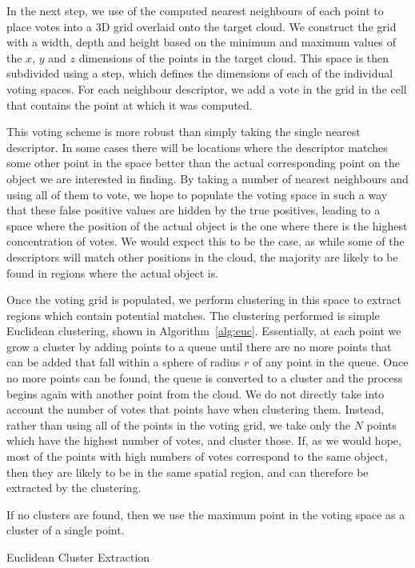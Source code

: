 \documentclass[11pt,a4paper]{kth-mag}
\begin{document}
In the next step, we use of the computed nearest neighbours of each point to
place votes into a 3D grid overlaid onto the target cloud. We construct the grid
with a width, depth and height based on the minimum and maximum values of the
$x$, $y$ and $z$ dimensions of the points in the target cloud. This space is
then subdivided using a step, which defines the dimensions of each of the
individual voting spaces. For each neighbour descriptor, we add a vote in the
grid in the cell that contains the point at which it was computed.

This voting scheme is more robust than simply taking the single nearest
descriptor. In some cases there will be locations where the descriptor matches
some other point in the space better than the actual corresponding point on the
object we are interested in finding. By taking a number of nearest neighbours
and using all of them to vote, we hope to populate the voting space in such a
way that these false positive values are hidden by the true positives, leading
to a space where the position of the actual object is the one where there is the
highest concentration of votes. We would expect this to be the case, as while
some of the descriptors will match other positions in the cloud, the majority
are likely to be found in regions where the actual object is.

Once the voting grid is populated, we perform clustering in this space to
extract regions which contain potential matches. The clustering performed is
simple Euclidean clustering, shown in Algorithm~\ref{alg:euc}. Essentially, at
each point we grow a cluster by adding points to a queue until there are no more
points that can be added that fall within a sphere of radius $r$ of any point in
the queue. Once no more points can be found, the queue is converted to a cluster
and the process begins again with another point from the cloud. We do not
directly take into account the number of votes that points have when clustering
them. Instead, rather than using all of the points in the voting grid, we take
only the $N$ points which have the highest number of votes, and cluster those.
If, as we would hope, most of the points with high numbers of votes correspond
to the same object, then they are likely to be in the same spatial region, and
can therefore be extracted by the clustering.

If no clusters are found, then we use the maximum point in the voting space as a
cluster of a single point.

\begin{algorithm}
  \DontPrintSemicolon
  \caption{Euclidean Cluster Extraction \cite{RusuDoctoralDissertation}}
  \label{alg:euc}
\end{algorithm}
\end{document}
